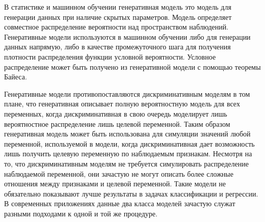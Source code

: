 \documentclass[../diploma.tex]{subfiles}
\begin{document}
В статистике и машинном обучении генеративная модель это модель для генерации данных при наличие скрытых параметров. Модель определяет совместное распределение вероятности над пространством наблюдений. Генеративные модели используются в машинном обучении либо для генерации данных напрямую, либо в качестве промежуточного шага для получения плотности распределения функции условной вероятности. Условное распределение может быть получено из генеративной модели с помощью теоремы Байеса.

Генеративные модели противопоставляются дискриминативным моделям в том плане, что генеративная описывает полную вероятностную модель для всех переменных, когда дискриминативная в свою очередь моделирует лишь вероятностное распределение лишь целевой переменной. Таким образом генеративная модель может быть использована для симуляции значений любой переменной, используемой в модели, когда дискриминативная дает возможность лишь получить целевую переменную по наблюдаемым признакам. Несмотря на то, что дискриминативным моделям не требуется симулировать распределение наблюдаемой переменной, они зачастую не могут описать более сложные отношения между признаками и целевой переменной. Такие модели не обязательно показывают лучше результаты в задачах классификации и регрессии. В современных приложениях данные два класса моделей зачастую служат разными подходами к одной и той же процедуре.
\cite{wiki:generative}
\end{document}
